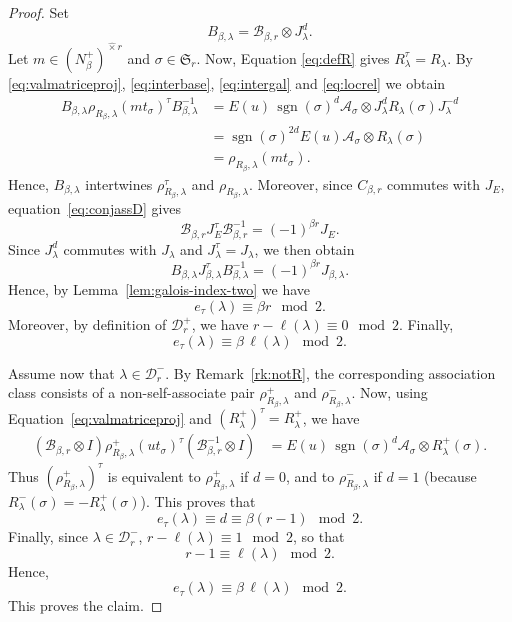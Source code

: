 \documentclass[reqno]{amsart}
\DeclareMathOperator{\sgn}{sgn}
\newcommand{\sym}{\mathfrak{S}}
\theoremstyle{definition}
\begin{document}
\begin{proof}
\noindent
Set \[
B_{\beta,\lambda}
=
\mathcal B_{\beta,r}\otimes J_\lambda^d.
\]
Let $m\in (N_\beta^+)^{\widehat{\times} r}$ and $\sigma\in\sym_r$. 
Now, Equation \eqref{eq:defR} gives $R_\lambda^\tau= R_\lambda$. By
\eqref{eq:valmatriceproj}, \eqref{eq:interbase}, \eqref{eq:intergal} and
\eqref{eq:locrel} we
obtain
\[
\begin{aligned}
B_{\beta,\lambda}
\rho_{R_\beta,\lambda}(mt_\sigma)^\tau
B_{\beta,\lambda}^{-1}
&=
E(u)\,
\sgn(\sigma)^d\mathcal A_\sigma
\otimes
J_\lambda^dR_\lambda(\sigma)J_\lambda^{-d}\\
&=
\sgn(\sigma)^{2d}E(u)\mathcal A_\sigma\otimes R_\lambda(\sigma)\\
&=\rho_{R_\beta,\lambda}(m t_\sigma).
\end{aligned}
\]
Hence, $B_{\beta,\lambda}$ intertwines $\rho_{R_\beta,\lambda}^\tau$ and
$\rho_{R_\beta,\lambda}$. Moreover, since $C_{\beta,r}$ commutes with
$J_E$, equation~\eqref{eq:conjassD} gives
\[
\mathcal B_{\beta,r}J_E^\tau\mathcal B_{\beta,r}^{-1}
=
(-1)^{\beta r}J_E.
\]
Since $J_\lambda^d$ commutes with $J_\lambda$ and
$J_\lambda^\tau=J_\lambda$, we then obtain
\[
B_{\beta,\lambda}
J_{\beta,\lambda}^\tau
B_{\beta,\lambda}^{-1}
=
(-1)^{\beta r}J_{\beta,\lambda}.
\]
Hence, by Lemma~\ref{lem:galois-index-two} we have
\[
e_\tau(\lambda)
\equiv\beta r\mod2.
\]
Moreover, by definition of $\mathcal D_r^+$, we have
$r-\ell(\lambda)\equiv0\mod2$. Finally,
\[
e_\tau(\lambda)
\equiv
\beta\,\ell(\lambda)
\mod2.
\]

Assume now that $\lambda\in\mathcal D_r^-$. By Remark~\ref{rk:notR}, the
corresponding association class consists of a non-self-associate pair $
\rho_{R_\beta,\lambda}^+$  and $\rho_{R_\beta,\lambda}^-$.
Now, using Equation~\eqref{eq:valmatriceproj} and
$(R_\lambda^+)^\tau=R_\lambda^+$,
we have
\[
\begin{aligned}
(\mathcal B_{\beta,r}\otimes I)
\rho_{R_\beta,\lambda}^+(ut_\sigma)^\tau
(\mathcal B_{\beta,r}^{-1}\otimes I)
&=
E(u)\,
\sgn(\sigma)^d\mathcal A_\sigma
\otimes R_\lambda^+(\sigma).
\end{aligned}
\]
Thus $(\rho_{R_\beta,\lambda}^+)^\tau$ is equivalent to
$\rho_{R_\beta,\lambda}^+$ if $d=0$, and to
$\rho_{R_\beta,\lambda}^-$ if $d=1$ (because
$R_\lambda^-(\sigma)=-R_\lambda^+(\sigma)$). This proves that
\[
e_\tau(\lambda)
\equiv d
\equiv\beta(r-1)
\mod2.
\]
Finally, since $\lambda\in\mathcal D_r^-$, $ r-\ell(\lambda)\equiv1\mod2
$, so that
\[
r-1\equiv\ell(\lambda)\mod2.
\]
Hence,
\[
e_\tau(\lambda)
\equiv
\beta\,\ell(\lambda)
\mod2.
\]
This proves the claim.
\end{proof}
\end{document}
